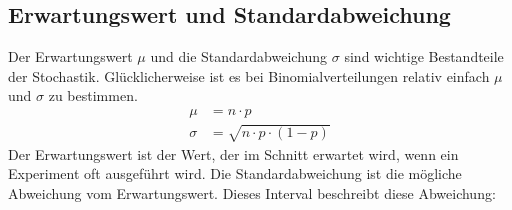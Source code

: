 \subsection{Erwartungswert und Standardabweichung}
\begin{flushleft}
    Der Erwartungswert $\mu$ und die Standardabweichung $\sigma$ sind wichtige Bestandteile der Stochastik.
    Glücklicherweise ist es bei Binomialverteilungen relativ einfach $\mu$ und $\sigma$ zu bestimmen.
    \begin{align}
        \mu &= n \cdot p \\
        \sigma &= \sqrt{n \cdot p \cdot (1-p)}
    \end{align}
    Der Erwartungswert ist der Wert, der im Schnitt erwartet wird, wenn ein Experiment oft ausgeführt wird.
    Die Standardabweichung ist die mögliche Abweichung vom Erwartungswert.
    Dieses Interval beschreibt diese Abweichung:
    \begin{align}
        [\mu-\sigma;\mu+\sigma]
    \end{align}
\end{flushleft}
